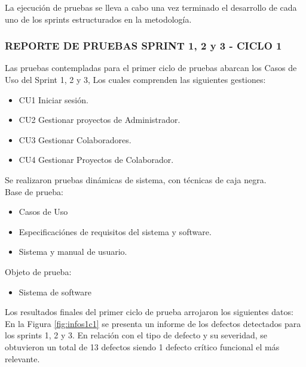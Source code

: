 La ejecución de pruebas se lleva a cabo una vez terminado el desarrollo de cada uno de los sprints estructurados en la metodología.\\

\subsubsection{REPORTE DE PRUEBAS SPRINT 1, 2 y 3 - CICLO 1}

Las pruebas contempladas para el primer ciclo de pruebas abarcan los Casos de Uso del Sprint 1, 2 y 3, Los cuales comprenden las siguientes gestiones:

\begin{itemize}
	\item CU1 Iniciar sesión.
	\item CU2 Gestionar proyectos de Administrador.
	\item CU3 Gestionar Colaboradores.
	\item CU4 Gestionar Proyectos de Colaborador.
\end{itemize}

Se realizaron pruebas dinámicas de sistema, con técnicas de caja negra.\\

Base de prueba:
\begin{itemize}
	\item Casos de Uso
	\item Especificaciónes de requisitos del sistema y software.
	\item Sistema y manual de usuario.
\end{itemize}

Objeto de prueba:
\begin{itemize}
	\item Sistema de software
\end{itemize}

\newpage

Los resultados finales del primer ciclo de prueba arrojaron los siguientes datos:\\

En la Figura \ref{fig:infos1c1} se presenta un informe de los defectos detectados para los sprints 1, 2 y 3. En relación con el tipo de defecto y su severidad, se obtuvieron un total de 13 defectos siendo 1 defecto crítico funcional el más relevante.

